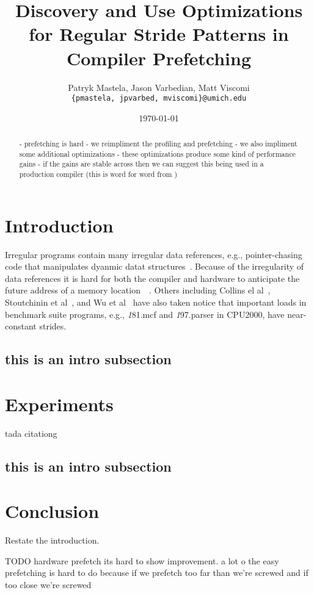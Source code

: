 \documentclass[11pt]{article}
\title{Discovery and Use Optimizations for Regular Stride Patterns in Compiler Prefetching}
\author{Patryk Mastela, Jason Varbedian, Matt Viscomi \\
  \small {\texttt {\{pmastela, jpvarbed, mviscomi\}@umich.edu}}}
\date{\today}
\begin{document}
  \maketitle

  \begin{abstract}
    - prefetching is hard
    - we reimpliment the profiling and prefetching
    - we also impliment some additional optimizations
    - these optimizations produce some kind of performance gains
    - if the gains are stable across then we can suggest this being used in a production compiler (this is word for word from ) ~\cite{WuEtAl2002}
  \end{abstract}
  
  \section{Introduction}
  Irregular programs contain many irregular data references, e.g., pointer-chasing code that manipulates dyanmic datat structures~\cite{WuEtAl2002}. Because of the irregularity of data references it is hard for both the compiler and hardware to anticipate the future address of a memory location~\cite{luk99}~\cite{roth98}. Others including Collins el al~\cite{collins01}, Stoutchinin et al~\cite{stoutchinin01}, and Wu et al~\cite{WuEtAl2002} have also taken
  notice that important loads in benchmark suite programs, e.g., {\textit 181.mcf} and {\textit 197.parser} in CPU2000, have near-constant strides. 
  \subsection{this is an intro subsection}
  
  \section{Experiments}
  tada citationg ~\cite{Wu2002} ~\cite{WuEtAl2002}
  ~\cite{metcalf93} ~\cite{prefetchsupportwebsite} ~\cite{dundas97} ~\cite{mowry98} ~\cite{luk99}
  \subsection{this is an intro subsection}

  \section{Conclusion}
  Restate the introduction.
  
  TODO hardware prefetch 
      its hard to show improvement. a lot o the easy prefetching is hard to do because if we prefetch too far than we're screwed and if too close we're screwed

  {}
  
\end{document}
